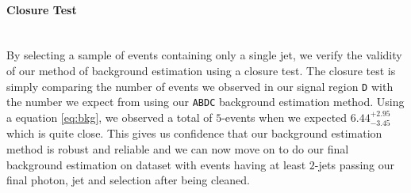 \paragraph*{Closure Test}\mbox{}\\
By selecting a sample of events containing only a single jet, we verify the validity of our method of background estimation using a closure test. The closure test is simply comparing the number of events we observed in our signal region \texttt{D} with the number we expect from using our \texttt{ABDC} background estimation method.
Using a equation \ref{eq:bkg}, we observed a total of $5$-events when we expected $6.44^{+2.95}_{-3.45}$ which is quite close. This gives us confidence that our  background estimation method is robust and reliable and we can now move on to do our final background estimation on dataset with events having at least $2$-jets passing our final photon, jet and \MET selection after being cleaned.
